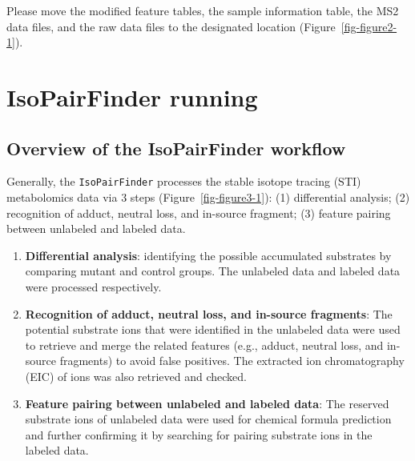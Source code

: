 \documentclass[
  letterpaper,
  DIV=11,
  numbers=noendperiod]{scrreprt}
\providecommand{\tightlist}{%
  \setlength{\itemsep}{0pt}\setlength{\parskip}{0pt}}
\begin{document}
Please move the modified feature tables, the sample information table,
the MS2 data files, and the raw data files to the designated location
(Figure~\ref{fig-figure2-1}).


\chapter{IsoPairFinder running}\label{sec-isoPairFinder-running}

\section{Overview of the IsoPairFinder
workflow}\label{overview-of-the-isopairfinder-workflow}

Generally, the \texttt{IsoPairFinder} processes the stable isotope
tracing (STI) metabolomics data via 3 steps
(Figure~\ref{fig-figure3-1}): (1) differential analysis; (2) recognition
of adduct, neutral loss, and in-source fragment; (3) feature pairing
between unlabeled and labeled data.

\begin{enumerate}
\def\labelenumi{\arabic{enumi}.}
\tightlist
\item
  \textbf{Differential analysis}: identifying the possible accumulated
  substrates by comparing mutant and control groups. The unlabeled data
  and labeled data were processed respectively.
\item
  \textbf{Recognition of adduct, neutral loss, and in-source fragments}:
  The potential substrate ions that were identified in the unlabeled
  data were used to retrieve and merge the related features (e.g.,
  adduct, neutral loss, and in-source fragments) to avoid false
  positives. The extracted ion chromatography (EIC) of ions was also
  retrieved and checked.
\item
  \textbf{Feature pairing between unlabeled and labeled data}: The
  reserved substrate ions of unlabeled data were used for chemical
  formula prediction and further confirming it by searching for pairing
  substrate ions in the labeled data.
\end{enumerate}
\end{document}
